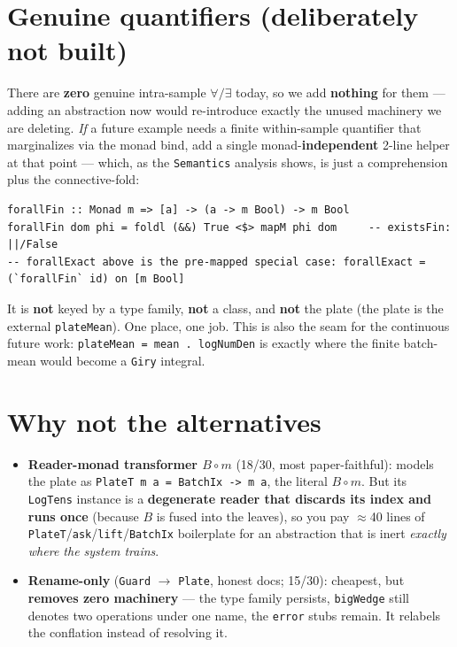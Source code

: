 \documentclass[11pt]{article}
\newcommand{\code}[1]{\texttt{#1}}
\begin{document}
\section*{Genuine quantifiers (deliberately not built)}

There are \textbf{zero} genuine intra-sample $\forall/\exists$ today, so we add \textbf{nothing} for them
--- adding an abstraction now would re-introduce exactly the unused machinery we are deleting. \emph{If} a
future example needs a finite within-sample quantifier that marginalizes via the monad bind, add a single
monad-\textbf{independent} 2-line helper at that point --- which, as the \code{Semantics} analysis shows, is
just a comprehension plus the connective-fold:

\begin{lstlisting}
forallFin :: Monad m => [a] -> (a -> m Bool) -> m Bool
forallFin dom phi = foldl (&&) True <$> mapM phi dom     -- existsFin: ||/False
-- forallExact above is the pre-mapped special case: forallExact = (`forallFin` id) on [m Bool]
\end{lstlisting}

It is \textbf{not} keyed by a type family, \textbf{not} a class, and \textbf{not} the plate (the plate is
the external \code{plateMean}). One place, one job. This is also the seam for the continuous future work:
\code{plateMean = mean . logNumDen} is exactly where the finite batch-mean would become a \code{Giry}
integral.

\section*{Why not the alternatives}

\begin{itemize}
  \item \textbf{Reader-monad transformer $B \circ m$} (18/30, most paper-faithful): models the plate as
        \code{PlateT m a = BatchIx -> m a}, the literal $B \circ m$. But its \code{LogTens} instance is a
        \textbf{degenerate reader that discards its index and runs once} (because $B$ is fused into the
        leaves), so you pay $\approx$40 lines of \code{PlateT}/\code{ask}/\code{lift}/\code{BatchIx}
        boilerplate for an abstraction that is inert \emph{exactly where the system trains}.
  \item \textbf{Rename-only} (\code{Guard} $\to$ \code{Plate}, honest docs; 15/30): cheapest, but
        \textbf{removes zero machinery} --- the type family persists, \code{bigWedge} still denotes two
        operations under one name, the \code{error} stubs remain. It relabels the conflation instead of
        resolving it.
\end{itemize}
\end{document}
